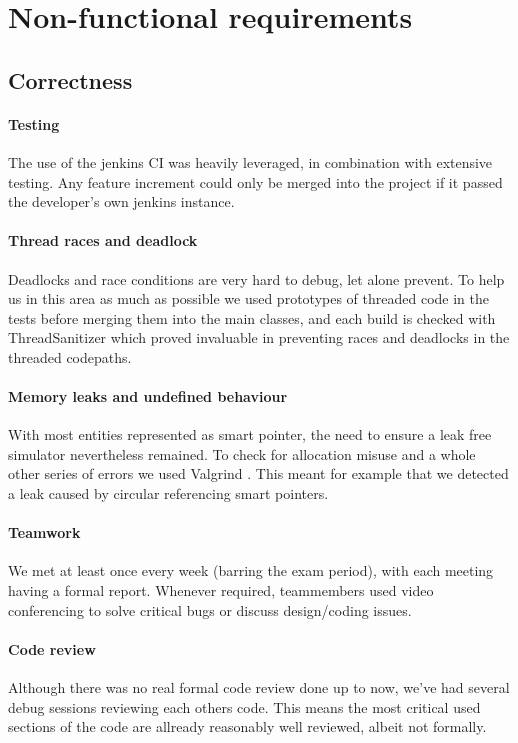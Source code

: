 \documentclass[8pt,a4paper]{report}
\begin{document}
\chapter{Non-functional requirements}
\section{Correctness}
\subsubsection{Testing}
The use of the jenkins CI was heavily leveraged, in combination with extensive testing. Any feature increment could only be merged into the project if it passed the developer's own jenkins instance.
\subsubsection{Thread races and deadlock}
Deadlocks and race conditions are very hard to debug, let alone prevent. To help us in this area as much as possible we used prototypes of threaded code in the tests before merging them into the main classes, and each build is checked with ThreadSanitizer \cite{tsan} which proved invaluable in preventing races and deadlocks in the threaded codepaths.
\subsubsection{Memory leaks and undefined behaviour}
With most entities represented as smart pointer, the need to ensure a leak free simulator nevertheless remained. To check for allocation misuse and a whole other series of errors we used Valgrind \cite{vg}. This meant for example that we detected a leak caused by circular referencing smart pointers.

\subsubsection{Teamwork}
We met at least once every week (barring the exam period), with each meeting having a formal report. Whenever required, teammembers used video conferencing to solve critical bugs or discuss design/coding issues.
\subsubsection{Code review}
Although there was no real formal code review done up to now, we've had several debug sessions reviewing each others code. This means the most critical used sections of the code are allready reasonably well reviewed, albeit not formally.
\end{document}
